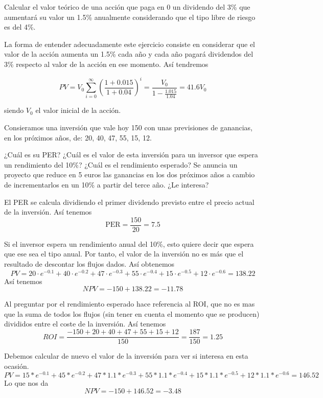 \begin{problem}[8]
Calcular el valor teórico de una acción que paga en 0 un dividendo del 3\%  que aumentará su valor un 1.5\% anualmente considerando que el tipo libre de riesgo es del 4\%.
\solution

La forma de entender adecuadamente este ejercicio consiste en considerar que el valor de la acción aumenta un 1.5\% cada año y cada año pagará dividendos del 3\% respecto al valor de la acción en ese momento. Así tendremos

\[PV = V_0\sum_{i=0}^{\infty}\left(\frac{1+0.015}{1+0.04}\right)^i = \frac{V_0}{1-\frac{1.015}{1.04}} = 41.6 V_0\]

siendo $V_0$ el valor inicial de la acción.
\end{problem}

\begin{problem}[9]
Consieramos una inversión que vale hoy 150 con unas previsiones de ganancias, en los próximos años, de: 20, 40, 47, 55, 15, 12.

\ppart ¿Cuál es su PER?
\ppart ¿Cuál es el valor de esta inversión para un inversor que espera un rendimiento del 10\%?
\ppart ¿Cuál es el rendimiento esperado?
\ppart Se anuncia un proyecto que reduce en 5 euros las ganancias en los dos próximos años a cambio de incrementarlos en un 10\% a partir del terce año. ¿Le interesa?
\solution

\spart

El PER se calcula dividiendo el primer dividendo previsto entre el precio actual de la inversión. Así tenemos
\[\text{PER} = \frac{150}{20} = 7.5\]

\spart

Si el inversor espera un rendimiento anual del 10\%, esto quiere decir que espera que ese sea el tipo anual. Por tanto, el valor de la inversión no es más que el resultado de descontar los flujos dados. Así obtenemos
\[PV = 20\cdot e^{-0.1} + 40 \cdot e^{-0.2} + 47 \cdot e^{-0.3} + 55 \cdot e^{-0.4} + 15 \cdot e^{-0.5} + 12 \cdot e^{-0.6} = 138.22\]
Así tenemos
\[NPV = -150 + 138.22 = -11.78\]

\spart

Al preguntar por el rendimiento esperado hace referencia al ROI, que no es mas que la suma de todos los flujos (sin tener en cuenta el momento que se producen) divididos entre el coste de la inversión. Así tenemos
\[ROI = \frac{-150+20+40+47+55+15+12}{150} = \frac{187}{150} = 1.25\]

\spart

Debemos calcular de nuevo el valor de la inversión para ver si interesa en esta ocasión.
\[PV = 15* e^{-0.1} + 45 * e^{-0.2} + 47* 1.1 * e^{-0.3} + 55 * 1.1 * e^{-0.4} + 15 * 1.1* e^{-0.5} + 12 * 1.1 * e^{-0.6} = 146.52\]
Lo que nos da
\[NPV = -150 + 146.52=-3.48\]
\end{problem}

